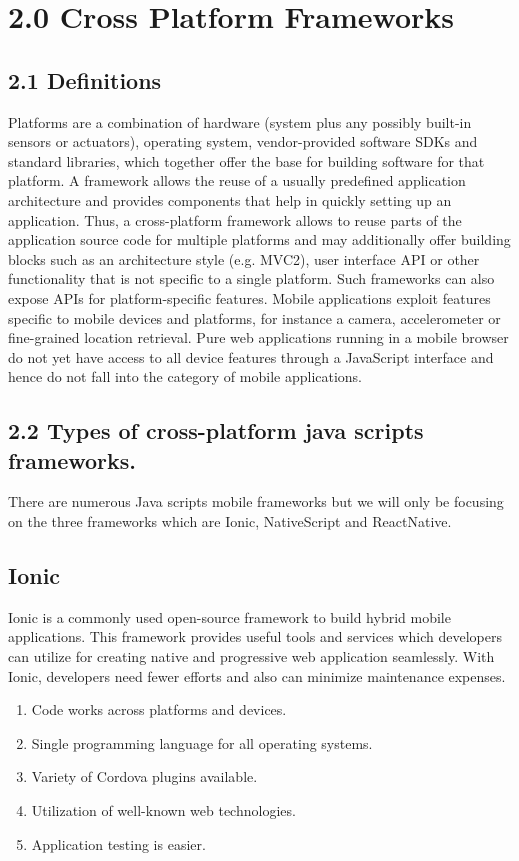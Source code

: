 \documentclass[12pt]{extreport}
\begin{document}
\newpage
\section*{2.0 Cross Platform Frameworks}
\subsection*{2.1 Definitions}

Platforms are a combination of hardware (system plus any possibly built-in sensors or actuators), operating system, vendor-provided software SDKs and standard libraries, which together offer the base for building software for that platform.
A framework allows the reuse of a usually predefined application architecture and provides components that help in quickly setting up an application. Thus, a cross-platform framework allows to reuse parts of the application source code for multiple platforms and may additionally offer building blocks such as an architecture style (e.g. MVC2), user interface API or other functionality that is not specific to a single platform. Such frameworks can also expose APIs for platform-specific features.
Mobile applications exploit features specific to mobile devices and platforms, for instance a camera, accelerometer or fine-grained location retrieval. Pure web applications running in a mobile browser do not yet have access to all device features through a JavaScript interface and hence do not fall into the category of mobile applications.

\subsection*{2.2 Types of cross-platform java scripts frameworks.}

There are numerous Java scripts mobile frameworks but we will only be focusing on the three frameworks which are Ionic, NativeScript and ReactNative.
\subsection*{Ionic}
Ionic is a commonly used open-source framework to build hybrid mobile applications. This framework provides useful tools and services which developers can utilize for creating native and progressive web application seamlessly. With Ionic, developers need fewer efforts and also can minimize maintenance expenses.
\begin{enumerate}
	\item{Code works across platforms and devices.}
	\item{Single programming language for all operating systems.}
	\item{Variety of Cordova plugins available.}
	\item{Utilization of well-known web technologies.}
	\item{Application testing is easier.}
\end{enumerate}
\end{document}
